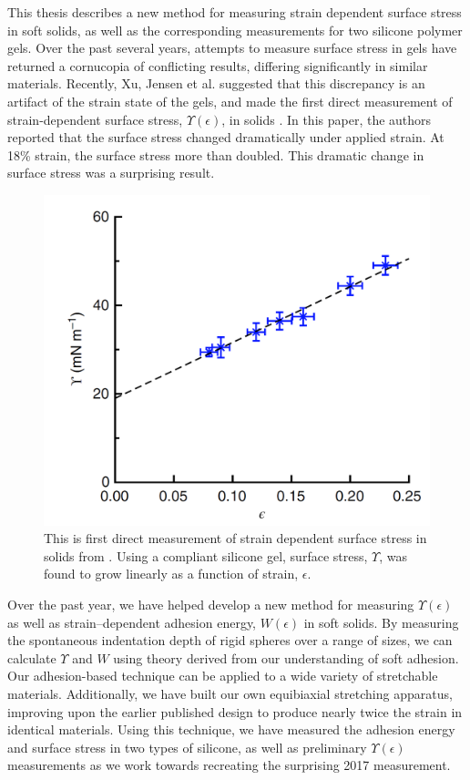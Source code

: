 This thesis describes a new method for measuring strain dependent surface stress in soft solids, as well as the corresponding measurements for two silicone polymer gels. Over the past several years, attempts to measure surface stress in gels have returned a cornucopia of conflicting results, differing significantly in similar materials. Recently, Xu, Jensen et al. suggested that this discrepancy is an artifact of the strain state of the gels, and made the first direct measurement of strain-dependent surface stress, $\Upsilon(\epsilon)$, in solids \cite{xu2017direct}. In this paper, the authors reported that the surface stress changed dramatically under applied strain. At 18\% strain, the surface stress more than doubled. This dramatic change in surface stress was a surprising result. 
\begin{figure}[h!]
	\centering
	\includegraphics[width=0.69\linewidth]{Chapters/Figures/2017natcomfig}
	\caption[Surface Stress vs. Strain in Silicone]{This is first direct measurement of strain dependent surface stress in solids from \cite{xu2017direct}. Using a compliant silicone gel, surface stress, $\Upsilon$, was found to grow linearly as a function of strain, $ \epsilon $.}
	\label{fig:2017natcomfig}
\end{figure}

Over the past year, we have helped develop a new method for measuring $\Upsilon(\epsilon)$ as well as strain--dependent adhesion energy, $ W(\epsilon) $ in soft solids. By measuring the spontaneous indentation depth of rigid spheres over a range of sizes, we can calculate $ \Upsilon $ and $ W $ using theory derived from our understanding of soft adhesion. Our adhesion-based technique can be applied to a wide variety of stretchable materials. Additionally, we have built our own equibiaxial stretching apparatus, improving upon the earlier published design \cite{xu2017direct} to produce nearly twice the strain in identical materials. Using this technique, we have measured the adhesion energy and surface stress in two types of silicone, as well as preliminary $ \Upsilon(\epsilon) $ measurements as we work towards recreating the surprising 2017 measurement.

